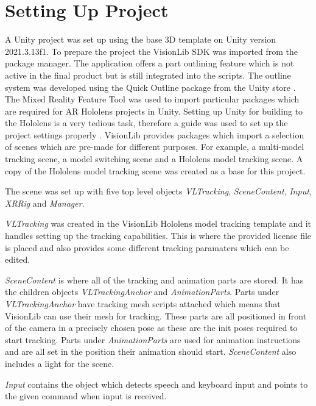 \documentclass{l4proj}
\begin{document}
\section{Setting Up Project}

A Unity project was set up using the base 3D template on Unity version 2021.3.13f1. To prepare the project the VisionLib SDK was imported from the package manager. The application offers a part outlining feature which is not active in the final product but is still integrated into the scripts. The outline system was developed using the Quick Outline package from the Unity store \citep{nolet_quick_2022}. The Mixed Reality Feature Tool \citep{kerawala_welcome_2022} was used to import particular packages which are required for AR Hololens projects in Unity. Setting up Unity for building to the Hololens is a very tedious task, therefore a guide was used to set up the project settings properly \citep{qianw211_unity_2022}. VisionLib provides packages which import a selection of scenes which are pre-made for different purposes. For example, a multi-model tracking scene, a model switching scene and a Hololens model tracking scene. A copy of the Hololens model tracking scene was created as a base for this project.

The scene was set up with five top level objects \textit{VLTracking}, \textit{SceneContent}, \textit{Input}, \textit{XRRig} and \textit{Manager}.

\textit{VLTracking} was created in the VisionLib Hololens model tracking template and it handles setting up the tracking capabilities. This is where the provided license file is placed and also provides some different tracking paramaters which can be edited.

\textit{SceneContent} is where all of the tracking and animation parts are stored. It has the children objects \textit{VLTrackingAnchor} and \textit{AnimationParts}. Parts under \textit{VLTrackingAnchor} have tracking mesh scripts attached which means that VisionLib can use their mesh for tracking. These parts are all positioned in front of the camera in a precisely chosen pose as these are the init poses required to start tracking. Parts under \textit{AnimationParts} are used for animation instructions and are all set in the position their animation should start. \textit{SceneContent} also includes a light for the scene.

\textit{Input} contains the object which detects speech and keyboard input and points to the given command when input is received.
\end{document}
